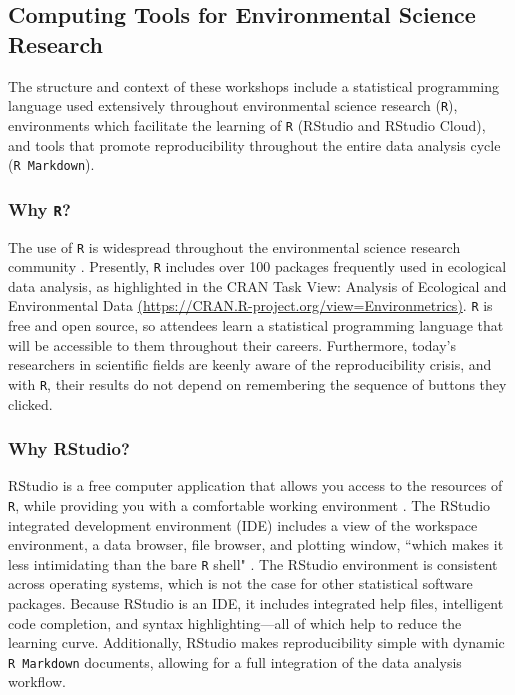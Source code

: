 \documentclass[12pt]{article}
\begin{document}
\subsection{Computing Tools for Environmental Science Research}  

\quad The structure and context of these workshops include a statistical programming language used extensively throughout environmental science research (\texttt{R}), environments which facilitate the learning of \texttt{R} (RStudio and RStudio Cloud), and tools that promote reproducibility throughout the entire data analysis cycle (\texttt{R Markdown}).

\subsubsection{Why \texttt{R}?} 

\quad The use of \texttt{R} is widespread throughout the environmental science research community \citep{Rpopular}. Presently, \texttt{R} includes over 100 packages frequently used in ecological data analysis, as highlighted in the CRAN Task View: Analysis of Ecological and Environmental Data \href{https://CRAN.R-project.org/view=Environmetrics}{(https://CRAN.R-project.org/view=Environmetrics)}. \texttt{R} is free and open source, so attendees learn a statistical programming language that will be accessible to them throughout their careers. Furthermore, today's researchers in scientific fields are keenly aware of the reproducibility crisis, and with \texttt{R}, their results do not depend on remembering the sequence of buttons they clicked. 

\subsubsection{Why RStudio?}

\quad RStudio is a free computer application that allows you access to the resources of \texttt{R}, while providing you with a comfortable working environment \citep{rstudio}. The RStudio integrated development environment (IDE) includes a view of the workspace environment, a data browser, file browser, and plotting window, ``which makes it less intimidating than the bare \texttt{R} shell" \citep[p. 59]{mine}. The RStudio environment is consistent across operating systems, which is not the case for other statistical software packages. Because RStudio is an IDE, it includes integrated help files, intelligent code completion, and syntax highlighting---all of which help to reduce the learning curve. Additionally, RStudio makes reproducibility simple with dynamic \texttt{R Markdown} documents, allowing for a full integration of the data analysis workflow.
\end{document}
